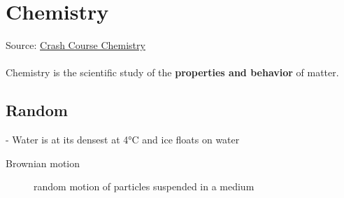 \newcommand\el[2]{\text{#1}_{#2}}
\newcommand\sucrose{\overbrace{\el{C}{12}\el{H}{22}\el{O}{11}}^{\text{sucrose}}}
\newcommand\oxygen{\el{O}{2}}
\newcommand\carbonDioxide{\el{C}{}\el{O}{2}}
\newcommand\water{\el{H}{2}\el{O}{}}

\section{Chemistry}
Source: \href{https://www.youtube.com/watch?v=uVFCOfSuPTo&list=PL8dPuuaLjXtPHzzYuWy6fYEaX9mQQ8oGr}{Crash Course Chemistry}
\\\\
Chemistry is the scientific study of the \textbf{properties and behavior} of matter.













\subsection{Random}
- Water is at its densest at 4°C and ice floats on water

\begin{description}
    \item[Brownian motion] random motion of particles suspended in a medium
\end{description}